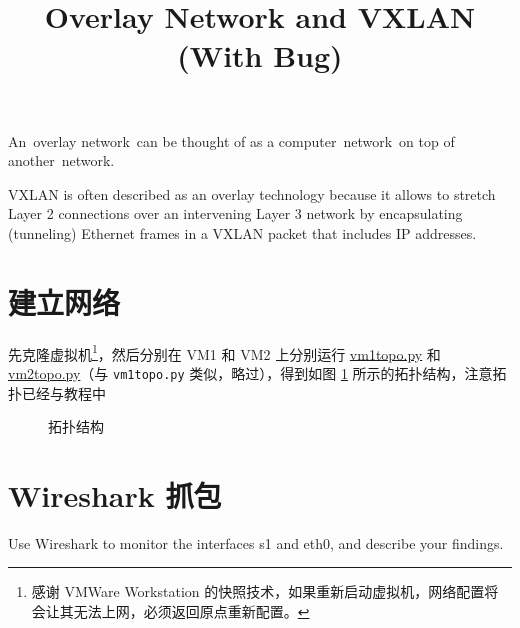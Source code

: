 \endofdump
{}

    \title{Overlay Network and VXLAN (With Bug)}
    \maketitle
    \tableofcontents
    \vfill
    An overlay network can be thought of as a computer network on top of another network. 

    VXLAN is often described as an overlay technology because it allows to stretch Layer 2 connections over an intervening Layer 3 network by encapsulating (tunneling) Ethernet frames in a VXLAN packet that includes IP addresses.
    \vfill
    \clearpage
    \section{建立网络}

    先克隆虚拟机\footnote{感谢 VMWare Workstation 的快照技术，如果重新启动虚拟机，网络配置将会让其无法上网，必须返回原点重新配置。}，然后分别在 VM1 和 VM2 上分别运行 \href{run:vm1topo.py}{vm1topo.py} 和 \href{run:vm2topo.py}{vm2topo.py}（与 \verb"vm1topo.py" 类似，略过），得到如图 \ref{fig:toposym} 所示的拓扑结构，注意拓扑已经与教程中





    \begin{figure}[H]
        \centering
        
        \caption{拓扑结构}\label{fig:toposym}
    \end{figure}

    \section{Wireshark 抓包}
    Use Wireshark to monitor the interfaces s1 and eth0, and describe your findings.

